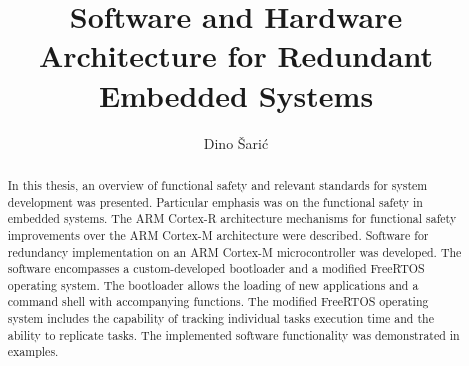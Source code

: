 \documentclass[utf8, diplomski, english, numeric]{fer}
\begin{document}

\title{Software and Hardware Architecture for Redundant Embedded Systems}

\author{Dino Šarić}

\maketitle

\izvornik
%


\tableofcontents
\listoffigures
\listoftables













\begin{abstract}

In this thesis, an overview of functional safety and relevant standards for system development was presented. Particular emphasis was on the functional safety in embedded systems. The ARM Cortex-R architecture mechanisms for functional safety improvements over the ARM Cortex-M architecture were described. Software for redundancy implementation on an ARM Cortex-M microcontroller was developed. The software encompasses a custom-developed bootloader and a modified FreeRTOS operating system. The bootloader allows the loading of new applications and a command shell with accompanying functions. The modified FreeRTOS operating system includes the capability of tracking individual tasks execution time and the ability to replicate tasks. The implemented software functionality was demonstrated in examples.  %

\end{abstract}
\end{document}
